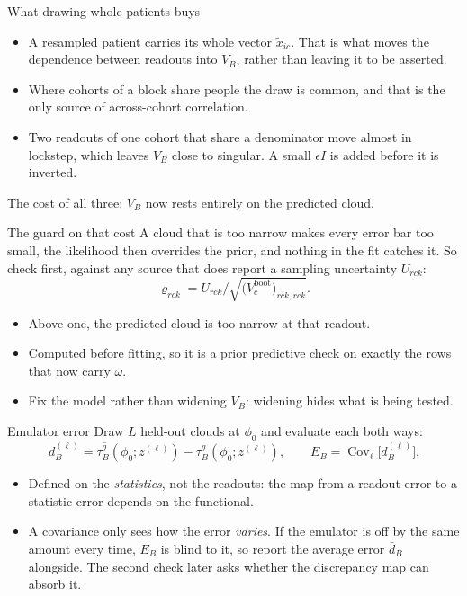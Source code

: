 \documentclass[10pt,aspectratio=169]{beamer}
\DeclareMathOperator*{\Cov}{Cov}
\begin{document}
\begin{frame}[t]{What drawing whole patients buys}
  \begin{itemize}\setlength\itemsep{9pt}
    \item A resampled patient carries its whole vector $\tilde x_{ic}$. That is
      what moves the dependence between readouts into $V_B$, rather than leaving
      it to be asserted.
    \item Where cohorts of a block share people the draw is common, and that is
      the only source of across-cohort correlation.
    \item Two readouts of one cohort that share a denominator move almost in
      lockstep, which leaves $V_B$ close to singular. A small $\epsilon I$ is
      added before it is inverted.
  \end{itemize}
  \vfill
  The cost of all three: $V_B$ now rests entirely on the predicted cloud.
\end{frame}

\begin{frame}[t]{The guard on that cost}
  A cloud that is too narrow makes every error bar too small, the likelihood
  then overrides the prior, and nothing in the fit catches it. So check first,
  against any source that does report a sampling uncertainty $U_{rck}$:
  \[
    \varrho_{rck} = U_{rck}\Big/\sqrt{\big(V^{\text{boot}}_c\big)_{rck,rck}} .
  \]
  \begin{itemize}
    \item Above one, the predicted cloud is too narrow at that readout.
    \item Computed before fitting, so it is a prior predictive check on exactly
      the rows that now carry $\omega$.
    \item \alert{Fix the model rather than widening $V_B$}: widening hides what
      is being tested.
  \end{itemize}
\end{frame}

\begin{frame}[t]{Emulator error}
  Draw $L$ held-out clouds at $\phi_0$ and evaluate each both ways:
  \[
    d^{(\ell)}_B = \tau^{\widehat g}_B(\phi_0;z^{(\ell)}) - \tau^{g}_B(\phi_0;z^{(\ell)}),
    \qquad E_B = \Cov_\ell\big[d^{(\ell)}_B\big].
  \]
  \begin{itemize}
    \item Defined on the \emph{statistics}, not the readouts: the map from a
      readout error to a statistic error depends on the functional.
    \item A covariance only sees how the error \emph{varies}. If the emulator
      is off by the same amount every time, $E_B$ is blind to it, so
      \alert{report the average error $\bar d_B$ alongside}. The second check
      later asks whether the discrepancy map can absorb it.
  \end{itemize}
\end{frame}
\end{document}

